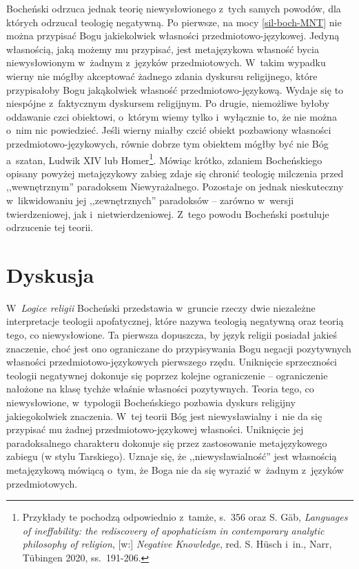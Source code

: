 Bocheński odrzuca jednak teorię niewysłowionego z~tych samych powodów, dla których odrzucał teologię negatywną. Po pierwsze, na mocy \ref{sil-boch-MNT} nie można przypisać Bogu jakiekolwiek własności przedmiotowo-językowej. Jedyną własnością, jaką możemy mu przypisać, jest metajęzykowa własność bycia niewysłowionym w~żadnym z~języków przedmiotowych. W~takim wypadku wierny nie mógłby akceptować żadnego zdania dyskursu religijnego, które przypisałoby Bogu jakąkolwiek własność przedmiotowo-językową. Wydaje się to niespójne z~faktycznym dyskursem religijnym. Po drugie, niemożliwe byłoby oddawanie czci obiektowi, o~którym wiemy tylko i~wyłącznie to, że nie można o~nim nic powiedzieć. Jeśli wierny miałby czcić obiekt pozbawiony własności przedmiotowo-językowych, równie dobrze tym obiektem mógłby być nie Bóg a~szatan, Ludwik XIV lub Homer\footnote{Przykłady te pochodzą odpowiednio z~tamże, s.~356 oraz S. Gäb, \textit{Languages of ineffability: the rediscovery of apophaticism in contemporary analytic philosophy of religion}, [w:] \textit{Negative Knowledge}, red. S. Hüsch i~in., Narr, Tübingen 2020, ss.~191-206.}. Mówiąc krótko, zdaniem Bocheńskiego opisany powyżej metajęzykowy zabieg zdaje się chronić teologię milczenia przed ,,wewnętrznym'' paradoksem Niewyrażalnego. Pozostaje on jednak nieskuteczny w~likwidowaniu jej ,,zewnętrznych'' paradoksów -- zarówno w~wersji twierdzeniowej, jak i~nietwierdzeniowej. Z~tego powodu Bocheński postuluje odrzucenie tej teorii.


\section{Dyskusja}\label{sil-boch-dyskusja}

W~\textit{Logice religii} Bocheński przedstawia w~gruncie rzeczy dwie niezależne interpretacje teologii apofatycznej, które nazywa teologią negatywną oraz teorią tego, co niewysłowione. Ta pierwsza dopuszcza, by język religii posiadał jakieś znaczenie, choć jest ono ograniczane do przypisywania Bogu negacji pozytywnych własności przedmiotowo-językowych pierwszego rzędu. Uniknięcie sprzeczności teologii negatywnej dokonuje się poprzez kolejne ograniczenie -- ograniczenie nałożone na klasę tychże właśnie własności pozytywnych. Teoria tego, co niewysłowione, w~typologii Bocheńskiego pozbawia dyskurs religijny jakiegokolwiek znaczenia. W~tej teorii Bóg jest niewysławialny i~nie da się przypisać mu żadnej przedmiotowo-językowej własności. Uniknięcie jej paradoksalnego charakteru dokonuje się przez zastosowanie metajęzykowego zabiegu (w stylu Tarskiego). Uznaje się, że ,,niewysławialność'' jest własnością metajęzykową mówiącą o~tym, że Boga nie da się wyrazić w~żadnym z~języków przedmiotowych.

